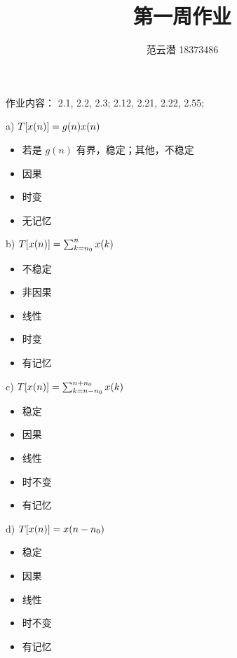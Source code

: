 \documentclass[lang=cn,11pt,a4paper,cite=authoryear]{elegantpaper}
\title{第一周作业}
\author{范云潜 18373486}
\institute{微电子学院 184111 班}
\date{\zhtoday}
\begin{document}
\maketitle

作业内容： 2.1, 2.2, 2.3; 2.12, 2.21, 2.22, 2.55;

\setlength{\columnseprule}{0.4pt}
\begin{multicols*}{2}



    a) \({T}[x(n)] = g(n) x(n)\) 

    \begin{itemize}
        \item 若是 \(g(n)\) 有界，稳定；其他，不稳定
        \item 因果
        \item 时变
        \item 无记忆
    \end{itemize}

    b) \({T}[x(n)] = \sum_{k=n_0}^n x(k)\) 

    \begin{itemize}
        \item 不稳定
        \item 非因果
        \item 线性
        \item 时变
        \item 有记忆
    \end{itemize}

    c) \({T}[x(n)] = \sum_{k=n-n_0}^{n+n_0} x(k)\) 

    \begin{itemize}
        \item 稳定
        \item 因果
        \item 线性
        \item 时不变
        \item 有记忆
    \end{itemize}

    d) \({T}[x(n)] = x(n-n_0)\)

    \begin{itemize}
        \item 稳定
        \item 因果
        \item 线性
        \item 时不变
        \item 有记忆
    \end{itemize}


\end{multicols*}
\end{document}
